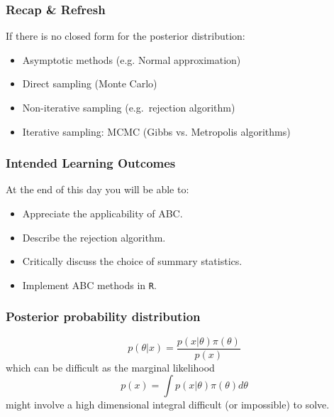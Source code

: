 \documentclass{beamer}
\newcommand{\1}{\ensuremath{\mathbf{1}}}
\begin{document}
%
%
%
\begin{frame}\frametitle{Recap \& Refresh}
	If there is no closed form for the posterior distribution:
	\begin{itemize}
		\item Asymptotic methods (e.g. Normal approximation)
		\item Direct sampling (Monte Carlo)
		\item Non-iterative sampling (e.g.\ rejection algorithm)
		\item Iterative sampling: MCMC (Gibbs vs. Metropolis algorithms)
	\end{itemize}
\end{frame}
%
%
%
\begin{frame}\frametitle{Intended Learning Outcomes}
	At the end of this day you will be able to:
	\begin{itemize}
		\item Appreciate the applicability of ABC.
		\item Describe the rejection algorithm.
		\item Critically discuss the choice of summary statistics.
		\item Implement ABC methods in \texttt{R}.
	\end{itemize}
\end{frame}
%
%
%
\begin{frame}\frametitle{Posterior probability distribution}
	\begin{equation}
		p(\theta|x) = \frac{p(x|\theta)\pi(\theta)}{p(x)}
	\end{equation}
	which can be difficult as the marginal likelihood
	\begin{equation}
		p(x) = \int p(x|\theta)\pi(\theta)d\theta
	\end{equation}
	might involve a high dimensional integral difficult (or impossible) to solve.
\end{frame}
%
%
%
\end{document}
